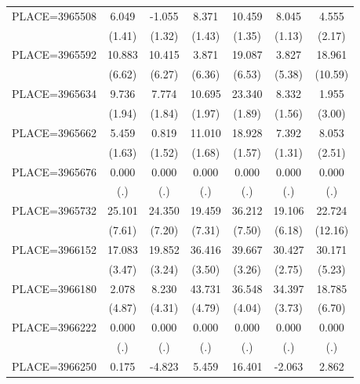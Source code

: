 {\begin{tabular}{l*{6}{c}}
PLACE=3965508       &       6.049&      -1.055&       8.371&      10.459&       8.045&       4.555\\
                    &      (1.41)&      (1.32)&      (1.43)&      (1.35)&      (1.13)&      (2.17)\\
PLACE=3965592       &      10.883&      10.415&       3.871&      19.087&       3.827&      18.961\\
                    &      (6.62)&      (6.27)&      (6.36)&      (6.53)&      (5.38)&     (10.59)\\
PLACE=3965634       &       9.736&       7.774&      10.695&      23.340&       8.332&       1.955\\
                    &      (1.94)&      (1.84)&      (1.97)&      (1.89)&      (1.56)&      (3.00)\\
PLACE=3965662       &       5.459&       0.819&      11.010&      18.928&       7.392&       8.053\\
                    &      (1.63)&      (1.52)&      (1.68)&      (1.57)&      (1.31)&      (2.51)\\
PLACE=3965676       &       0.000&       0.000&       0.000&       0.000&       0.000&       0.000\\
                    &         (.)&         (.)&         (.)&         (.)&         (.)&         (.)\\
PLACE=3965732       &      25.101&      24.350&      19.459&      36.212&      19.106&      22.724\\
                    &      (7.61)&      (7.20)&      (7.31)&      (7.50)&      (6.18)&     (12.16)\\
PLACE=3966152       &      17.083&      19.852&      36.416&      39.667&      30.427&      30.171\\
                    &      (3.47)&      (3.24)&      (3.50)&      (3.26)&      (2.75)&      (5.23)\\
PLACE=3966180       &       2.078&       8.230&      43.731&      36.548&      34.397&      18.785\\
                    &      (4.87)&      (4.31)&      (4.79)&      (4.04)&      (3.73)&      (6.70)\\
PLACE=3966222       &       0.000&       0.000&       0.000&       0.000&       0.000&       0.000\\
                    &         (.)&         (.)&         (.)&         (.)&         (.)&         (.)\\
PLACE=3966250       &       0.175&      -4.823&       5.459&      16.401&      -2.063&       2.862\\

\end{tabular}}
